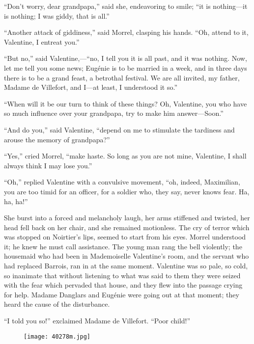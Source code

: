 “Don’t worry, dear grandpapa,” said she, endeavoring to smile; “it is
nothing—it is nothing; I was giddy, that is all.”

“Another attack of giddiness,” said Morrel, clasping his hands. “Oh,
attend to it, Valentine, I entreat you.”

“But no,” said Valentine,—“no, I tell you it is all past, and it was
nothing. Now, let me tell you some news; Eugénie is to be married in a
week, and in three days there is to be a grand feast, a betrothal
festival. We are all invited, my father, Madame de Villefort, and I—at
least, I understood it so.”

“When will it be our turn to think of these things? Oh, Valentine, you
who have so much influence over your grandpapa, try to make him
answer—Soon.”

“And do you,” said Valentine, “depend on me to stimulate the tardiness
and arouse the memory of grandpapa?”

“Yes,” cried Morrel, “make haste. So long as you are not mine,
Valentine, I shall always think I may lose you.”

“Oh,” replied Valentine with a convulsive movement, “oh, indeed,
Maximilian, you are too timid for an officer, for a soldier who, they
say, never knows fear. Ha, ha, ha!”

She burst into a forced and melancholy laugh, her arms stiffened and
twisted, her head fell back on her chair, and she remained motionless.
The cry of terror which was stopped on Noirtier’s lips, seemed to start
from his eyes. Morrel understood it; he knew he must call assistance.
The young man rang the bell violently; the housemaid who had been in
Mademoiselle Valentine’s room, and the servant who had replaced
Barrois, ran in at the same moment. Valentine was so pale, so cold, so
inanimate that without listening to what was said to them they were
seized with the fear which pervaded that house, and they flew into the
passage crying for help. Madame Danglars and Eugénie were going out at
that moment; they heard the cause of the disturbance.

“I told you so!” exclaimed Madame de Villefort. “Poor child!”

\begin{figure}[ht]
\texttt{[image: 40278m.jpg]}
\end{figure}
